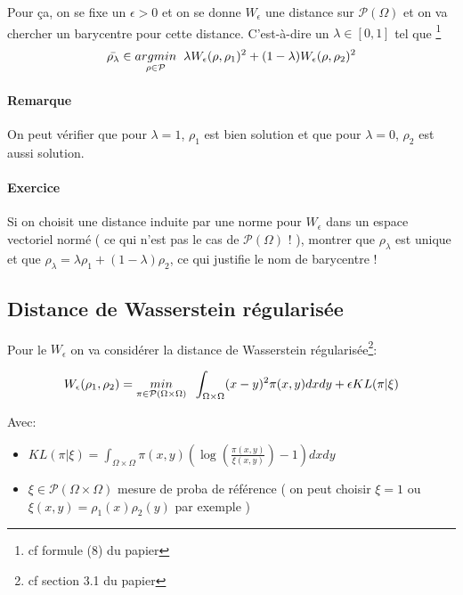 \documentclass[11pt]{article}
\begin{document}
    Pour ça, on se fixe un $\epsilon > 0$ et on se donne $W_\epsilon$ une distance sur $\mathcal{P}(\Omega)$ et on va chercher un barycentre pour cette distance. C'est-à-dire un $\lambda \in [0,1]$ tel que \footnote{cf formule (8) du papier}
    \begin{equation}
    \bar{\rho_\lambda} \in \underset{\rho \in \mathcal{P}}{argmin} \hspace{0.2cm} \lambda W_\epsilon(\rho, \rho_1)^2 + (1-\lambda) W_\epsilon(\rho, \rho_2)^2
    \end{equation}
    
    \paragraph{Remarque}
     On peut vérifier que pour $\lambda=1$, $\rho_1$ est bien solution et que pour $\lambda=0$, $\rho_2$ est aussi solution.
    
    \paragraph{Exercice}
    Si on choisit une distance induite par une norme pour $W_\epsilon$ dans un espace vectoriel normé ( ce qui n'est pas le cas de $\mathcal{P}(\Omega)$ ! ), montrer que $\rho_\lambda$ est unique et que $\rho_\lambda = \lambda \rho_1 + (1-\lambda) \rho_2$, ce qui justifie le nom de barycentre !
    
    \newpage
    \subsection{Distance de Wasserstein régularisée}
    
    Pour le $W_\epsilon$ on va considérer la distance de Wasserstein régularisée\footnote{cf section 3.1 du papier}:
    
    \begin{equation}
    W_\epsilon(\rho_1, \rho_2) = \underset{\pi \in \mathcal{P}(\Omega \times \Omega )}{min} \hspace{0.2cm} \int_{\Omega \times \Omega} (x-y)^2 \pi(x,y) dx dy + \epsilon KL(\pi | \xi )
    \end{equation}
    
    Avec:
    \begin{itemize}
    \item $KL(\pi | \xi ) = \int_{\Omega \times \Omega} \pi(x,y) (\log (\frac{\pi(x,y)}{\xi(x,y)}) -1) dx dy$
    \item $\xi \in \mathcal{P}(\Omega \times \Omega )$ mesure de proba de référence ( on peut choisir $\xi=1$ ou $\xi(x,y)= \rho_1(x) \rho_2(y)$ par exemple )
    \end{itemize}
     
\end{document}
